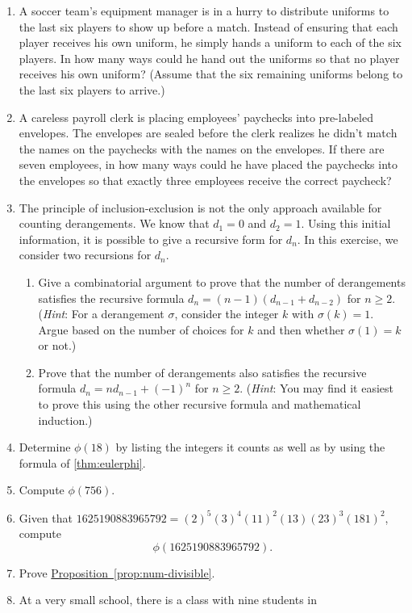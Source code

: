 \begin{enumerate}
\item A soccer team's equipment manager is in a hurry to distribute
  uniforms to the last six players to show up before a match. Instead
  of ensuring that each player receives his own uniform, he simply
  hands a uniform to each of the six players. In how many ways could
  he hand out the uniforms so that no player receives his own uniform?
  (Assume that the six remaining uniforms belong to the last six
  players to arrive.)
\item A careless payroll clerk is placing employees' paychecks into
  pre-labeled envelopes. The envelopes are sealed before the clerk
  realizes he didn't match the names on the paychecks with the names
  on the envelopes. If there are seven employees, in how many ways
  could he have placed the paychecks into the envelopes so that
  exactly three employees receive the correct paycheck?
\item The principle of inclusion-exclusion is not the only approach
  available for counting derangements. We know that $d_1=0$ and
  $d_2=1$. Using this initial information, it is possible to give a
  recursive form for $d_n$. In this exercise, we consider two
  recursions for $d_n$.
  \begin{enumerate}
  \item Give a combinatorial argument to prove that the number of
    derangements satisfies the recursive formula $d_n =
    (n-1)(d_{n-1}+d_{n-2})$ for $n\geq 2$. (\emph{Hint}: For a
    derangement $\sigma$, consider the integer $k$ with
    $\sigma(k)=1$. Argue based on the number of choices for $k$ and
    then whether $\sigma(1)=k$ or not.)
  \item Prove that the number of derangements also satisfies the
    recursive formula $d_n = nd_{n-1} + (-1)^n$ for $n\geq
    2$. (\emph{Hint}: You may find it easiest to prove this using the
    other recursive formula and mathematical induction.)
  \end{enumerate}
\item Determine $\phi(18)$ by listing the integers it counts as well
  as by using the formula of \autoref{thm:eulerphi}.
\item Compute $\phi(756)$.
\item Given that $1625190883965792 = (2)^5(3)^4(11)^2(13)(23)^3(181)^2$,
  compute \[\phi(1625190883965792).\] 
\item Prove
  \hyperref[prop:num-divisible]{Proposition~\ref*{prop:num-divisible}}.
\item At a very small school, there is a class with nine students in

\end{enumerate}
